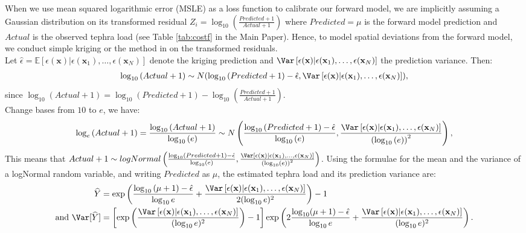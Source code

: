 \documentclass[a4paper,fleqn]{cas-sc}
\begin{document}
When we use mean squared logarithmic error (MSLE) as a loss function to calibrate our forward model, we are implicitly assuming a Gaussian distribution on its transformed residual $Z_{i} = \log_{10}\left(\frac{Predicted + 1}{Actual + 1}\right)$ where $Predicted = \mu$ is the forward model prediction and $Actual$ is the observed tephra load (see Table \ref{tab:costf} in the Main Paper). Hence, to model spatial deviations from the forward model, we conduct simple kriging or the method in \cite{worden2018} on the transformed residuals. 
\\
Let $\hat{\epsilon} = \mathbb{E}\left[\epsilon(\mathbf{x})|\epsilon(\mathbf{x}_{1}), 
    \dots, \epsilon(\mathbf{x}_{N})\right]$ denote the kriging prediction and $\Var\left[\epsilon(\mathbf{x})|\epsilon(\mathbf{x}_{1}), 
    \dots, \epsilon(\mathbf{x}_{N})\right]$ the prediction variance. Then:
\begin{gather}
    \log_{10}\left(Actual + 1\right) \sim N(\log_{10}\left(Predicted + 1\right) - \hat{\epsilon}, \Var\left[\epsilon(\mathbf{x})|\epsilon(\mathbf{x}_{1}), 
    \dots, \epsilon(\mathbf{x}_{N})\right]),
\end{gather}
since $\log_{10}\left(Actual + 1\right) = \log_{10}\left(Predicted + 1\right) - \log_{10}\left(\frac{Predicted + 1}{Actual + 1}\right)$. 
\\
Change bases from $10$ to $e$, we have:
\begin{gather}
    \log_{e}\left(Actual + 1\right) = \frac{\log_{10}\left(Actual + 1\right)}{\log_{10}\left(e\right)} \sim N\left(\frac{\log_{10}\left(Predicted + 1\right) - \hat{\epsilon}}{\log_{10}\left(e\right)}, \frac{\Var\left[\epsilon(\mathbf{x})|\epsilon(\mathbf{x}_{1}), 
    \dots, \epsilon(\mathbf{x}_{N})\right]}{\left(\log_{10}\left(e\right)\right)^2}\right),
\end{gather}
This means that $Actual + 1 \sim logNormal\left(\frac{\log_{10}\left(Predicted + 1\right) - \hat{\epsilon}}{\log_{10}\left(e\right)}, \frac{\Var\left[\epsilon(\mathbf{x})|\epsilon(\mathbf{x}_{1}), 
    \dots, \epsilon(\mathbf{x}_{N})\right]}{\left(\log_{10}\left(e\right)\right)^2}\right)$. 
Using the formulae for the mean and the variance of a logNormal random variable, and writing $Predicted$ as $\mu$, the estimated tephra load and its prediction variance are:
\begin{align}
\widehat{Y} &= \exp\left(\frac{\log_{10}\left(\mu + 1\right) - \hat{\epsilon}}{\log_{10}e} + \frac{\Var\left[\epsilon(\mathbf{x})|\epsilon(\mathbf{x}_{1}), 
    \dots, \epsilon(\mathbf{x}_{N})\right]}{2(\log_{10}e)^2}\right) - 1 \\
\text{and } \Var[\widehat{Y}] &= \left[\exp\left(\frac{\Var\left[\epsilon(\mathbf{x})|\epsilon(\mathbf{x}_{1}), 
    \dots, \epsilon(\mathbf{x}_{N})\right]}{(\log_{10}e)^2}\right) - 1\right]\exp\left(2\frac{\log_{10}(\mu + 1) - \hat{\epsilon}}{\log_{10}e} + \frac{\Var\left[\epsilon(\mathbf{x})|\epsilon(\mathbf{x}_{1}), 
    \dots, \epsilon(\mathbf{x}_{N})\right]}{(\log_{10}e)^2}\right).
\end{align}
\end{document}
